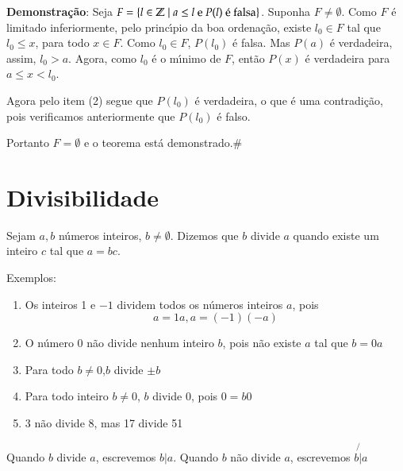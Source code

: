 \textbf{Demonstra{\c c}{\~a}o}:
Seja $F=\{l \in \Z \mid a \leq l\ \mbox{e}\ P(l)\ \mbox{{\'e} falsa}\}$. Suponha $F \neq \emptyset$. Como $F$ {\'e} limitado inferiormente, pelo princ{\'\i}pio da boa ordena{\c c}{\~a}o, existe $l_0 \in F$ tal que $l_{0} \leq x$, para todo $x \in F$. Como $l_{0} \in F$, $P(l_0)$ {\'e} falsa. Mas $P(a)$ {\'e} verdadeira, assim, $l_0 > a$. Agora, como $l_0$ {\'e} o m{\'\i}nimo de $F$, ent{\~a}o $P(x)$ {\'e} verdadeira para $a \leq x < l_0$.

Agora pelo item (2) segue que $P(l_0)$ {\'e} verdadeira, o que {\'e} uma contradi{\c c}{\~a}o, pois verificamos anteriormente que $P(l_0)$ {\'e} falso.

Portanto $F=\emptyset$ e o teorema est{\'a} demonstrado.\#

\section{Divisibilidade}

\begin{definicao}[Divis{\~a}o] Sejam $a,b$ n{\'u}meros inteiros, $b\neq\emptyset$. Dizemos que $b$ divide $a$ quando existe um inteiro $c$ tal que $a=bc$.\end{definicao}

Exemplos:
\begin{enumerate}
\item Os inteiros 1 e $-1$ dividem todos os n{\'u}meros inteiros $a$, pois \[a=1a,a=(-1)(-a)\]
\item O n{\'u}mero 0 n{\~a}o divide nenhum inteiro $b$, pois n{\~a}o existe $a$ tal que $b=0a$
\item Para todo $b\neq 0$,$b$ divide $\pm b$
\item Para todo inteiro $b\neq 0$, $b$ divide 0, pois $0=b0$
\item 3 n{\~a}o divide 8, mas 17 divide 51
\end{enumerate}

\begin{nota}[Divis{\~a}o] Quando $b$ divide $a$, escrevemos $b|a$. Quando $b$ n{\~a}o divide $a$, escrevemos $b\not{|}a$\end{nota}


